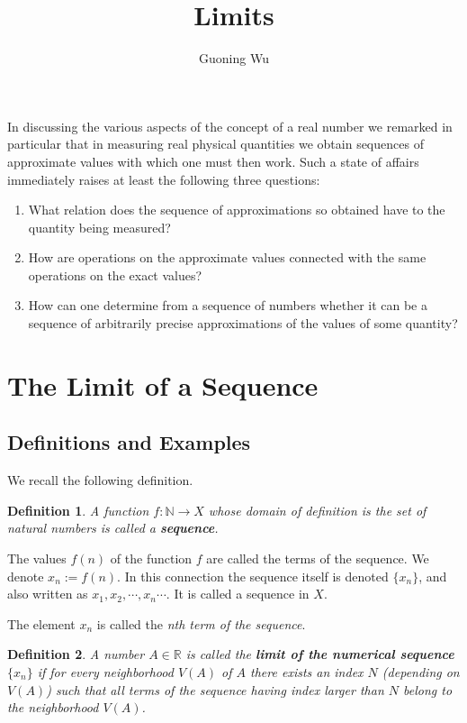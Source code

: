 \documentclass[a4paper,12pt]{article} %
\title{Limits}
\author{Guoning Wu}
\newtheorem{definition}{Definition}[section]
\begin{document}
\maketitle
In discussing the various aspects of the concept of a real number we 
remarked in particular that in measuring real physical quantities 
we obtain sequences of approximate values with which one must then 
work. Such a state of affairs immediately raises at least the following 
three questions:
\begin{enumerate}
    \item What relation does the sequence of approximations so obtained 
        have to the quantity being measured?
    \item How are operations on the approximate values connected with the 
        same operations on the exact values?
    \item How can one determine from a sequence of numbers whether it can
        be a sequence of arbitrarily precise approximations of the values 
        of some quantity?
\end{enumerate}

\section{The Limit of a Sequence}
\subsection{Definitions and Examples}
We recall the following definition.
\begin{definition}
    \emph{A function $f: \mathbb{N} \to X$ whose domain of definition is the set of 
    natural numbers is called a \textbf{sequence}.}
\end{definition}

The values $f(n)$ of the function $f$ are called the terms of the sequence. We 
denote $x_n  := f(n)$. In this connection the sequence itself is denoted $\{x_n\}$,
and also written as $x_1, x_2, \cdots , x_n \cdots $. It is called a sequence in $X$.

The element $x_n$ is called the \textit{nth term of the sequence}.

\begin{definition}
    \emph{
    A number $A \in \mathbb{R}$ is called the \textbf{limit of the numerical sequence}
     $\{x_n\}$ if for every neighborhood $V(A)$ of $A$ there exists an index $N$
    (depending on $V(A)$) such that all terms of the sequence having index larger 
    than $N$ belong to the neighborhood $V(A)$.
    }
\end{definition}
\end{document}
